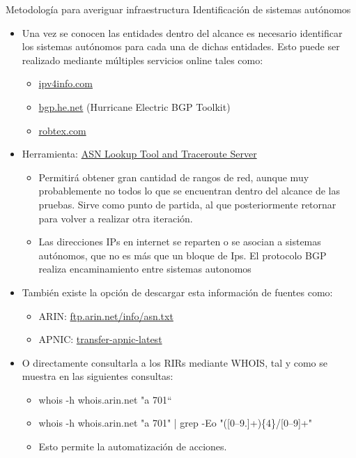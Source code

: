 \documentclass[aspectratio=169,11pt]{beamer}
\begin{document}
\begin{frame}[allowframebreaks]{Metodología para averiguar infraestructura}
\small
Identificación de sistemas autónomos
  \begin{itemize}
  \item Una vez se conocen las entidades dentro del alcance es necesario identificar los sistemas autónomos para cada una de dichas entidades. Esto puede ser realizado mediante múltiples servicios online tales como:
    \begin{itemize}
  \item \href{http://ipv4info.com/}{ipv4info.com}
  \item \href{https://bgp.he.net/}{bgp.he.net} (Hurricane Electric BGP Toolkit)
  \item \href{https://www.robtex.com/}{robtex.com}
    \end{itemize}

  \item Herramienta: \href{https://bgp.he.net/}{ASN Lookup Tool and Traceroute Server}
      \begin{itemize}
  \item Permitirá obtener gran cantidad de rangos de red, aunque muy probablemente no todos lo que se encuentran dentro del alcance de las pruebas. Sirve como punto de partida, al que posteriormente retornar para volver a realizar otra iteración.
  \item Las direcciones IPs en internet se reparten o se asocian a sistemas autónomos, que no es más que un bloque de Ips. El protocolo BGP realiza encaminamiento entre sistemas autonomos
      \end{itemize}

  \item También existe la opción de descargar esta información de fuentes como:
      \begin{itemize}
  \item ARIN: \href{https://ftp.arin.net/info/asn.txt}{ftp.arin.net/info/asn.txt}
  \item APNIC: \href{https://ftp.apnic.net/transfers/apnic/transfer-apnic-latest}{transfer-apnic-latest}
       \end{itemize}

  \item O directamente consultarla a los RIRs mediante WHOIS, tal y como se muestra en las siguientes consultas:
       \begin{itemize}
  \item whois -h whois.arin.net "a 701``
  \item whois -h whois.arin.net "a 701" | grep -Eo "([0--9.]+)\{4\}/[0--9]+"
  \item Esto permite la automatización de acciones.
       \end{itemize}

\end{itemize}
\end{frame}
\end{document}
